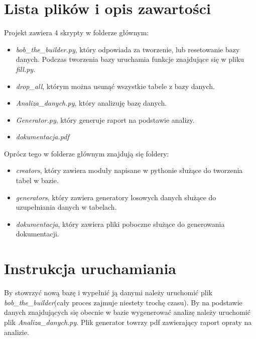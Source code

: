 \documentclass[12pt,a4paper]{article}
\begin{document}
\section{Lista plików i opis zawartości}
Projekt zawiera 4 skrypty w folderze głównym:
\begin{itemize}
\item \textit{bob\_the\_builder.py}, który odpowiada za tworzenie, lub resetowanie bazy danych. Podczas tworzenia bazy uruchamia funkcje znajdujące się w pliku \textit{fill.py}.
\item \textit{drop\_all}, którym można usunąć wszystkie tabele z bazy danych.
\item \textit{Analiza\_danych.py}, który analizuję bazę danych.
\item \textit{Generator.py}, który generuje raport na podstawie analizy.
\item \textit{dokumentacja.pdf}
\end{itemize}
Oprócz tego w folderze głównym znajdują się foldery:
\begin{itemize}
\item \textit{creators}, który zawiera moduły napisane w pythonie służące do tworzenia tabel w bazie.
\item \textit{generators}, który zawiera generatory losowych danych służące do uzupełniania danych w tabelach.
\item \textit{dokumentacja}, który zawiera pliki poboczne służące do generowania dokumentacji.
\end{itemize}
\section{Instrukcja uruchamiania}
By stowrzyć nową bazę i wypełnić ją danymi należy uruchomić plik \textit{bob\_the\_builder}(cały proces zajmuje niestety trochę czasu). By na podstawie danych znajdujących się obecnie w bazie wygenerować analizę należy uruchomić plik \textit{Analiza\_danych.py}. Plik generator towrzy pdf zawierający raport opraty na analizie.
\end{document}
